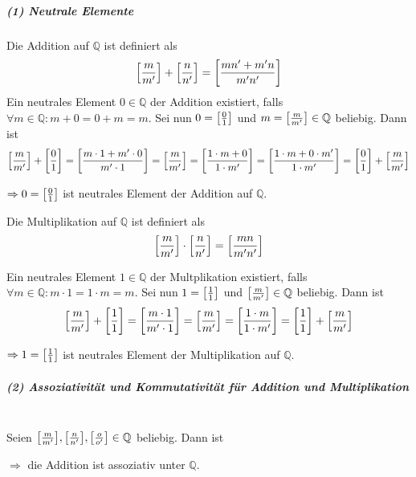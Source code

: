 \documentclass{scrreprt}
\begin{document}
\newpage
\subparagraph{(1) Neutrale Elemente}
Die Addition auf $\mathbb{Q}$ ist definiert als
\[
  \qty[\frac{m}{m'}] + \qty[\frac{n}{n'}] = \qty[\frac{mn' + m'n}{m'n'}]
\]
Ein neutrales Element $0 \in \mathbb{Q}$ der Addition existiert, falls
$\forall m \in \mathbb{Q} \colon m + 0 = 0 + m = m$.
Sei nun $0 = \qty[\frac{0}{1}]$ und $m = \qty[\frac{m}{m'}] \in \mathbb{Q}$
beliebig.
Dann ist
\[
  \qty[\frac{m}{m'}] + \qty[\frac{0}{1}] =
  \qty[\frac{m \cdot 1 + m' \cdot 0}{m' \cdot 1}]
  = \qty[\frac{m}{m'}]
  = \qty[\frac{1 \cdot m + 0}{1 \cdot m'}]
  = \qty[\frac{1 \cdot m + 0 \cdot m'}{1 \cdot m'}]
  = \qty[\frac{0}{1}] + \qty[\frac{m}{m'}]
\]

$\Rightarrow 0 = \qty[\frac{0}{1}]$ ist neutrales Element der Addition auf
$\mathbb{Q}$.

Die Multiplikation auf $\mathbb{Q}$ ist definiert als
\[
  \qty[\frac{m}{m'}] \cdot \qty[\frac{n}{n'}] = \qty[\frac{mn}{m'n'}]
\]

Ein neutrales Element $1 \in \mathbb{Q}$ der Multplikation existiert, falls
$\forall m \in \mathbb{Q} \colon m \cdot 1 = 1 \cdot m = m$.
Sei nun $1 = \qty[\frac{1}{1}]$ und $\qty[\frac{m}{m'}] \in \mathbb{Q}$
beliebig.
Dann ist
\[
  \qty[\frac{m}{m'}] + \qty[\frac{1}{1}] =
  \qty[\frac{m \cdot 1}{m' \cdot 1}]
  = \qty[\frac{m}{m'}]
  = \qty[\frac{1 \cdot m}{1 \cdot m'}]
  = \qty[\frac{1}{1}] + \qty[\frac{m}{m'}]
\]

$\Rightarrow 1 = \qty[\frac{1}{1}]$ ist neutrales Element der Multiplikation auf
$\mathbb{Q}$.

\subparagraph{(2) Assoziativität und Kommutativität für Addition und
  Multiplikation}

\:\\
Seien $\qty[\frac{m}{m'}], \qty[\frac{n}{n'}], \qty[\frac{o}{o'}] \in \mathbb{Q}$ beliebig.
Dann ist
$\Rightarrow$ die Addition ist assoziativ unter $\mathbb{Q}$.
\end{document}

